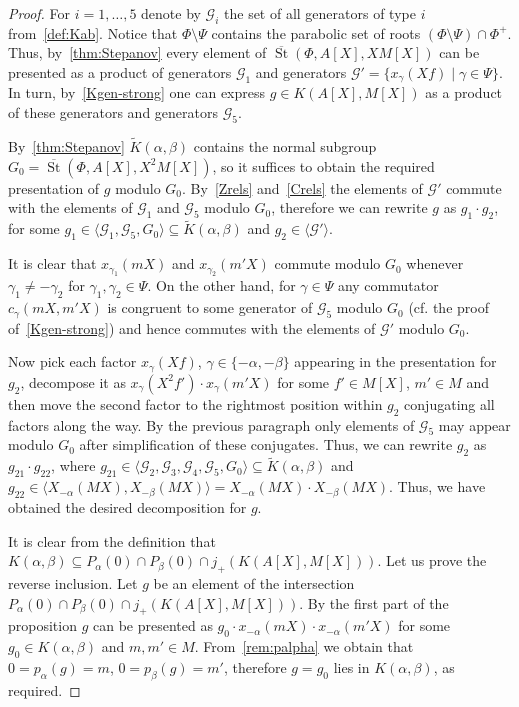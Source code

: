 \documentclass[oneside, 8pt]{amsart}
\theoremstyle{remark}
\theoremstyle{definition}
\numberwithin{lemma}{section}
\numberwithin{prop}{section}
\numberwithin{corollary}{section}
\numberwithin{externaltheorem}{section}
\DeclareMathOperator{\St}{St}
\numberwithin{equation}{section}
\begin{document}
\begin{proof} 
For $i=1,\ldots,5$ denote by $\mathcal{G}_i$ the set of all generators of type $i$ from~\cref{def:Kab}.
Notice that $\Phi \setminus \Psi$ contains the parabolic set of roots $(\Phi \setminus \Psi)\cap \Phi^+$.
Thus, by~\cref{thm:Stepanov} every element of $\overline{\St}(\Phi, A[X], XM[X])$ can be presented as a product of generators $\mathcal{G}_1$ and generators $\mathcal{G}' = \{ x_{\gamma}(Xf) \mid \gamma \in \Psi\}$. 
In turn, by~\cref{Kgen-strong} one can express $g \in K(A[X], M[X])$ as a product of these generators and generators $\mathcal{G}_5$. 

By~\cref{thm:Stepanov} $\widetilde{K}(\alpha, \beta)$ contains the normal subgroup $G_0 = \overline{\St}(\Phi, A[X], X^2M[X])$, so it suffices to obtain the required presentation of $g$ modulo $G_0$. By~\cref{Zrels} and~\cref{Crels} the elements of $\mathcal{G}'$ commute with the elements of $\mathcal{G}_1$ and $\mathcal{G}_5$ modulo $G_0$, therefore we can rewrite $g$ as $g_1 \cdot g_2$, for some $g_1 \in \langle \mathcal{G}_1, \mathcal{G}_5, G_0 \rangle \subseteq \widetilde{K}(\alpha, \beta)$ and $g_2 \in \langle \mathcal{G}' \rangle$.

It is clear that  $x_{\gamma_1}(mX)$ and $x_{\gamma_2}(m'X)$ commute modulo $G_0$ whenever $\gamma_1 \neq - \gamma_2$ for $\gamma_1, \gamma_2 \in \Psi$. On the other hand, for $\gamma \in \Psi$ any commutator $c_{\gamma}(mX, m'X)$ is congruent to some generator of $\mathcal{G}_5$  modulo $G_0$ (cf. the proof of~\cref{Kgen-strong}) and hence commutes with the elements of $\mathcal{G}'$ modulo $G_0$. 

Now pick each factor $x_{\gamma}(Xf)$, $\gamma \in \{ -\alpha, -\beta \}$ appearing in the presentation for $g_2$, decompose it as $x_{\gamma}(X^2f') \cdot x_{\gamma}(m'X)$ for some $f' \in M[X]$, $m' \in M$ and then move the second factor to the rightmost position within $g_2$ conjugating all factors along the way. By the previous paragraph only elements of  $\mathcal{G}_5$ may appear modulo $G_0$ after simplification of these conjugates.
Thus, we can rewrite $g_2$ as $g_{21} \cdot g_{22}$, where $g_{21} \in \langle \mathcal{G}_2, \mathcal{G}_3, \mathcal{G}_4, \mathcal{G}_5, G_0 \rangle \subseteq \widetilde{K}(\alpha, \beta)$ and $g_{22} \in \langle X_{-\alpha}(MX), X_{-\beta}(MX) \rangle = X_{-\alpha}(MX) \cdot X_{-\beta}(MX)$.
Thus, we have obtained the desired decomposition for $g$.
 
It is clear from the definition that $K(\alpha, \beta) \subseteq P_\alpha(0) \cap P_\beta(0) \cap j_+(K(A[X], M[X]))$. 
Let us prove the reverse inclusion. Let $g$ be an element of the intersection $P_\alpha(0) \cap P_\beta(0) \cap j_+(K(A[X], M[X]))$.
By the first part of the proposition $g$ can be presented as $g_0 \cdot x_{-\alpha}(mX) \cdot x_{-\alpha}(m'X)$ for some $g_0 \in K(\alpha, \beta)$ and $m, m' \in M$. From~\cref{rem:palpha} we obtain that $0 = p_\alpha(g) = m$, $0 = p_\beta(g) = m'$, therefore $g = g_0$ lies in $K(\alpha, \beta)$, as required. \end{proof}
 
\end{document}
